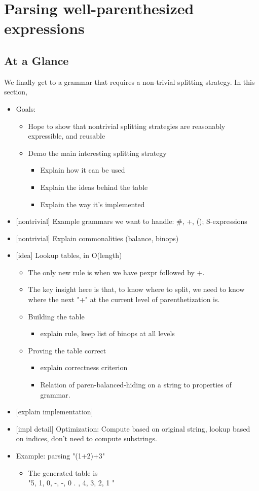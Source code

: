 \chapter{Parsing well-parenthesized expressions}
\section{At a Glance}
  We finally get to a grammar that requires a non-trivial splitting strategy.  In this section,   
  \begin{itemize} \item  Goals:
    \begin{itemize} \item  Hope to show that nontrivial splitting strategies are reasonably expressible, and reusable 
    \item  Demo the main interesting splitting strategy 
      \begin{itemize} \item  Explain how it can be used 
      \item  Explain the ideas behind the table 
      \item  Explain the way it's implemented \end{itemize} \end{itemize}
  \item  {}[nontrivial] Example grammars we want to handle: \#, +, (); S-expressions
  \item  {}[nontrivial] Explain commonalities (balance, binops)
  \item  {}[idea] Lookup tables, in O(length)
    \begin{itemize} \item  The only new rule is when we have pexpr followed by +. 
    \item  The key insight here is that, to know where to split, we need to know where the next "+" at the current level of parenthetization is. 
    \item  Building the table 
      \begin{itemize} \item  explain rule, keep list of binops at all levels \end{itemize} 
    \item  Proving the table correct 
      \begin{itemize} \item  explain correctness criterion 
      \item  Relation of paren-balanced-hiding on a string to properties of grammar. \end{itemize} \end{itemize}
  \item  {}[explain implementation]
  \item  {}[impl detail] Optimization: Compute based on original string, lookup based on indices, don't need to compute substrings.
  \item  Example: parsing "(1+2)+3"
    \begin{itemize} \item  The generated table is  \\
      "5, 1, 0, -, -, 0 .
        , 4, 3, 2, 1
      "
\end{itemize} \end{itemize}